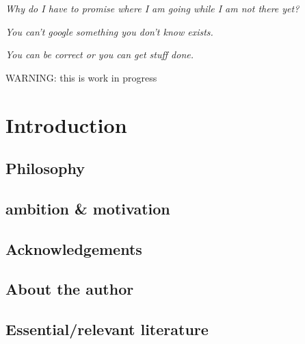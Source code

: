 \documentclass[a4paper]{article}
\begin{document}
\vspace{7cm}

\begin{center}
{\sl Why do I have to promise where I am going while I am not there yet?}

\vspace{1cm}

{\sl You can't google something you don't know exists.}

\vspace{1cm}

{\sl You can be correct or you can get stuff done.}
\end{center}





\newpage
\maketitle
\tableofcontents
\newpage
\begin{center}
{\color{red} \huge WARNING: this is work in progress}
\end{center}

\section{Introduction}

\subsection{Philosophy}  %
\subsection{ambition \& motivation}  %
\subsection{Acknowledgements}  %
\subsection{About the author}  %
\subsection{Essential/relevant literature}  %
\end{document}
